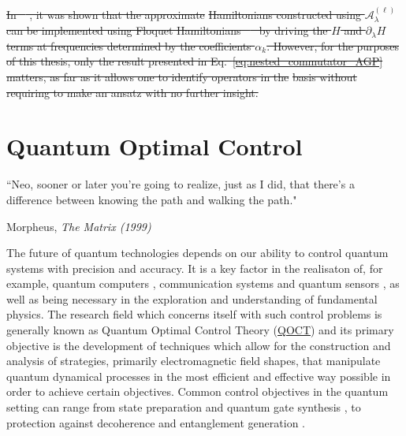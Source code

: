 \documentclass[a4paper,oneside,11pt]{book}
\newcommand{\dlambda}{\partial_{\lambda}}
\newcommand{\AGP}[1]{\mathcal{A}_{#1}}
\newcommand{\acrref}[1]{\hyperref[acr:#1]{#1}}
\providecommand{\DIFdeltex}[1]{{\protect\color{red}\sout{#1}}}                      %
\providecommand{\DIFdelbegin}{} %
\providecommand{\DIFdelend}{} %
\providecommand{\DIFdel}[1]{\texorpdfstring{\DIFdeltex{#1}}{}} %
\newcommand{\DIFscaledelfig}{0.5}
\newlength{\DIFdelgraphicswidth} %
\newlength{\DIFdelgraphicsheight} %
\newcommand{\DIFdelincludegraphics}[2][]{%
\sbox{\DIFdelgraphicsbox}{\DIFOincludegraphics[#1]{#2}}%
\settoboxwidth{\DIFdelgraphicswidth}{\DIFdelgraphicsbox} %
\settoboxtotalheight{\DIFdelgraphicsheight}{\DIFdelgraphicsbox} %
\scalebox{\DIFscaledelfig}{%
\parbox[b]{\DIFdelgraphicswidth}{\usebox{\DIFdelgraphicsbox}\\[-\baselineskip] \rule{\DIFdelgraphicswidth}{0em}}\llap{\resizebox{\DIFdelgraphicswidth}{\DIFdelgraphicsheight}{%
\setlength{\unitlength}{\DIFdelgraphicswidth}%
\begin{picture}(1,1)%
\thicklines\linethickness{2pt} %
{\color[rgb]{1,0,0}\put(0,0){\framebox(1,1){}}}%
{\color[rgb]{1,0,0}\put(0,0){\line( 1,1){1}}}%
{\color[rgb]{1,0,0}\put(0,1){\line(1,-1){1}}}%
\end{picture}%
}\hspace*{3pt}}} %
} %
\DeclareRobustCommand{\DIFdelbegin}{\DIFOdelbegin \let\includegraphics\DIFdelincludegraphics} %
\DeclareRobustCommand{\DIFdelend}{\DIFOaddend \let\includegraphics\DIFOincludegraphics} %
\begin{document}
\DIFdelbegin \DIFdel{In \mbox{%
\cite{claeys_floquet-engineering_2019}}\hskip0pt%
, it was shown that the approximate }%
\DIFdel{Hamiltonians constructed using $\AGP{\lambda}^{(\ell)}$ can be implemented using Floquet Hamiltonians \mbox{%
\cite{goldman_periodically_2014} }\hskip0pt%
by driving the $H$ and $\dlambda H$ terms at frequencies determined by the coefficients $\alpha_k$. However, for the purposes of this thesis, only the result presented in Eq.~\eqref{eq:nested_commutator_AGP} matters, as far as it allows one to identify operators in the }%
\DIFdel{basis without requiring to make an ansatz with no further insight.
}\DIFdelend \chapter{Quantum Optimal Control}\label{chap:3_Quantum_Optimal_control}
\epigraph{``Neo, sooner or later you’re going to realize, just as I did, that there’s a difference between knowing the path and walking the path."}{Morpheus, \emph{The Matrix (1999)}}

The future of quantum technologies depends on our ability to control quantum systems with precision and accuracy. It is a key factor in the realisaton of, for example, quantum computers \cite{ball_software_2021}, communication systems \cite{omran_generation_2019} and quantum sensors \cite{le_robust_2021}, as well as being necessary in the exploration and understanding of fundamental physics. The research field which concerns itself with such control problems is generally known as Quantum Optimal Control Theory (\acrref{QOCT}) \cite{koch_quantum_2022,glaser_training_2015} and its primary objective is the development of techniques which allow for the construction and analysis of strategies, primarily electromagnetic field shapes, that manipulate quantum dynamical processes in the most efficient and effective way possible in order to achieve certain objectives. Common control objectives in the quantum setting can range from state preparation \cite{zhang_when_2019} and quantum gate synthesis \cite{pelegri_high-fidelity_2022}, to protection against decoherence \cite{rooney_decoherence_2012} and entanglement generation \cite{omran_generation_2019}.
\end{document}
